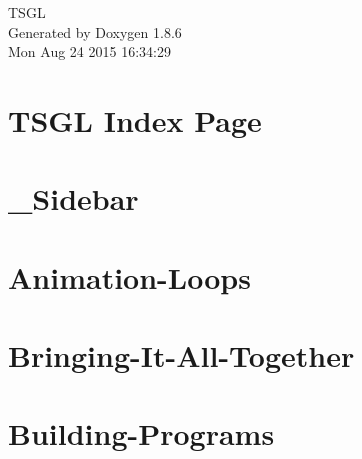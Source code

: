 \documentclass[twoside]{book}
\newcommand{\clearemptydoublepage}{%
  \newpage{\pagestyle{empty}\cleardoublepage}%
}
\begin{document}
\hypersetup{pageanchor=false}
\begin{titlepage}
\vspace*{7cm}
\begin{center}%
{\Large T\-S\-G\-L }\\
\vspace*{1cm}
{\large Generated by Doxygen 1.8.6}\\
\vspace*{0.5cm}
{\small Mon Aug 24 2015 16:34:29}\\
\end{center}
\end{titlepage}
\clearemptydoublepage
\tableofcontents
\clearemptydoublepage
{}
\hypersetup{pageanchor=true}

\chapter{T\-S\-G\-L Index Page}
\label{index}\hypertarget{index}{}
\chapter{\-\_\-\-Sidebar}
\label{md__home_kodemonkey__desktop__t_s_g_l_docs-wiki___sidebar}
\hypertarget{md__home_kodemonkey__desktop__t_s_g_l_docs-wiki___sidebar}{}

\chapter{Animation-\/\-Loops}
\label{md__home_kodemonkey__desktop__t_s_g_l_docs-wiki__animation-_loops}
\hypertarget{md__home_kodemonkey__desktop__t_s_g_l_docs-wiki__animation-_loops}{}

\chapter{Bringing-\/\-It-\/\-All-\/\-Together}
\label{md__home_kodemonkey__desktop__t_s_g_l_docs-wiki__bringing-_it-_all-_together}
\hypertarget{md__home_kodemonkey__desktop__t_s_g_l_docs-wiki__bringing-_it-_all-_together}{}

\chapter{Building-\/\-Programs}
\label{md__home_kodemonkey__desktop__t_s_g_l_docs-wiki__building-_programs}
\hypertarget{md__home_kodemonkey__desktop__t_s_g_l_docs-wiki__building-_programs}{}

\end{document}
